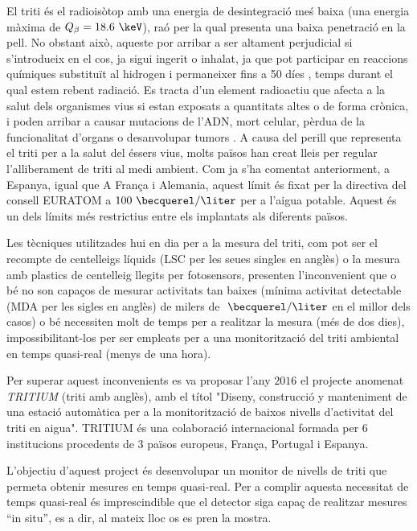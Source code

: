 El triti és el radioisòtop amb una energia de desintegració meś baixa (una energia màxima de $Q_\beta=18.6~\keV$), raó per la qual presenta una baixa penetració en la pell. No obstant això, aqueste por arribar a ser altament perjudicial si s'introdueix en el cos, ja sigui ingerit o inhalat, ja que pot participar en reaccions químiques substituït al hidrogen i permaneixer fins a 50 díes \cite{EstimationTritiumDosiKangarooRats, TissueDistribution}, temps durant el qual estem rebent radiació. Es tracta d'un element radioactiu que afecta a la salut dels organismes vius si estan exposats a quantitats altes o de forma crònica, i poden arribar a causar mutacions de l'ADN, mort celular, pèrdua de la funcionalitat d'organs o desanvolupar tumors \cite{StraumeTritiumHazard}. A causa del perill que representa el triti per a la salut del éssers vius, molts països han creat lleis per regular l'alliberament de triti al medi ambient. Com ja s'ha comentat anteriorment, a Espanya, igual que A França i Alemania, aquest límit és fixat per la directiva del consell EURATOM a $100~\becquerel/\liter$ per a l'aigua potable. Aquest és un dels límits més restrictius entre els implantats als diferents països.

Les tècniques utilitzades hui en dia per a la mesura del triti, com pot ser el recompte de centelleigs líquids (LSC per les seues singles en anglès) o la mesura amb plastics de centelleig llegits per fotosensors, presenten l'inconvenient que o bé no son capaços de mesurar activitats tan baixes (mínima activitat detectable (MDA per les sigles en anglès) de milers de $~\becquerel/\liter$ en el millor dels casos) o bé necessiten molt de temps per a realitzar la mesura (més de dos dies), impossibilitant-los per ser empleats per a una monitorització del triti ambiental en temps quasi-real (menys de una hora).

Per superar aquest inconvenients es va proposar l'any $2016$ el projecte anomenat \textit{TRITIUM} (triti amb anglès), amb el títol "Diseny, construcció y manteniment de una estació automàtica per a la monitorització de baixos nivells d'activitat del triti en aigua". TRITIUM és una colaboració internacional formada per $6$ institucions procedents de $3$ països europeus, França, Portugal i Espanya.

L'objectiu d'aquest project és desenvolupar un monitor de nivells de triti que permeta obtenir mesures en temps quasi-real. Per a complir aquesta necessitat de temps quasi-real és imprescindible que el detector siga capaç de realitzar mesures ``in situ'', es a dir, al mateix lloc os es pren la mostra.

